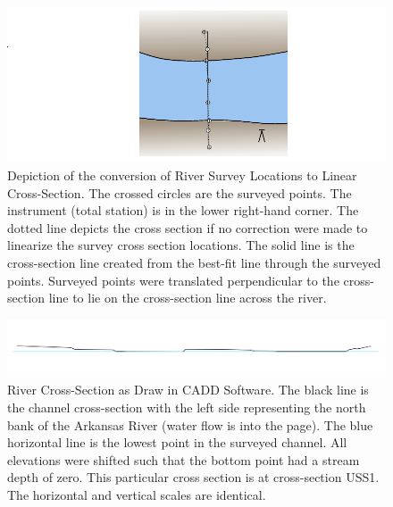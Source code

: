 \begin{linenumbers}
\begin{figure}[htbp]
\centering
	\includegraphics[width=6in]{Figures/LineDiagram/SurveyPlanView}
	\caption[Depiction of the conversion of River Survey Locations to Linear Cross-Section.]{Depiction of the conversion of River Survey Locations to Linear Cross-Section.  The crossed circles are the surveyed points.  The instrument (total station) is in the lower right-hand corner.  The dotted line depicts the cross section if no correction were made to linearize the survey cross section locations.  The solid line is the cross-section line created from the best-fit line through the surveyed points.  Surveyed points were translated perpendicular to the cross-section line to lie on the cross-section line across the river.}
	\label{fig:SurveyPlanView}
\end{figure}

\begin{figure}[htbp]
\centering
	\includegraphics[width=6in]{Figures/LineDiagram/USS1Trim}
	\caption[River Cross-Section as Draw in CADD Software.]{River Cross-Section as Draw in CADD Software.  The black line is the channel cross-section with the left side representing the north bank of the Arkansas River (water flow is into the page).  The blue horizontal line is the lowest point in the surveyed channel.  All elevations were shifted such that the bottom point had a stream depth of zero.  This particular cross section is at cross-section USS1.  The horizontal and vertical scales are identical.}
	\label{fig:SurveySection}
\end{figure}


\end{linenumbers}
